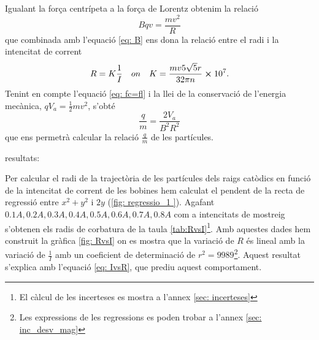 \documentclass[11pt]{article}
\begin{document}
Igualant la força centrípeta a la força de Lorentz obtenim la relació 
\begin{equation}
    Bqv=\frac{mv^2}{R}
    \label{eq: fc=fl}
\end{equation}
que combinada amb l'equació \ref{eq: B} ens dona la relació entre el radi i la intencitat de corrent
\begin{equation}
    R=K\frac{1}{I} \quad on \quad K=\frac{mv5\sqrt{5}r}{32\pi n}\cross 10^7.
    \label{eq: IvsR}
\end{equation}
Tenint en compte l'equació \ref{eq: fc=fl} i la llei de la conservació de l'energia mecànica, $qV_a = \frac{1}{2}mv^2$, s'obté 
\begin{equation}
    \frac{q}{m}=\frac{2V_a }{B^2R^2}
    \label{eq: q/m}
\end{equation}
que ens permetrà calcular la relació $\frac{q}{m}$ de les partícules.

resultats:

Per calcular el radi de la trajectòria de les partícules dels raigs catòdics en funció de la intencitat de corrent de les bobines hem calculat el pendent de la recta de regressió entre $x^2+y^2$ i $2y$ (\ref{fig: regressio_1 }). Agafant $0.1A, 0.2A, 0.3A, 0.4A, 0.5A, 0.6A, 0.7A, 0.8A$ com a intencitats de mostreig s'obtenen els radis de corbatura de la taula \ref{tab:RvsI}\footnote{El càlcul de les incerteses es mostra a l'annex \ref{sec: incerteses}}. Amb aquestes dades hem construit la gràfica \ref{fig: RvsI} on es mostra que la variació de $R$ és lineal amb la variació de $\frac{1}{I}$ amb un coeficient de determinació de $r^2=9989$\footnote{Les expressions de les regressions es poden trobar a l'annex \ref{sec: inc_desv_mag}}. Aquest resultat s'explica amb l'equació \ref{eq: IvsR}, que prediu aquest comportament.


 
\end{document}
